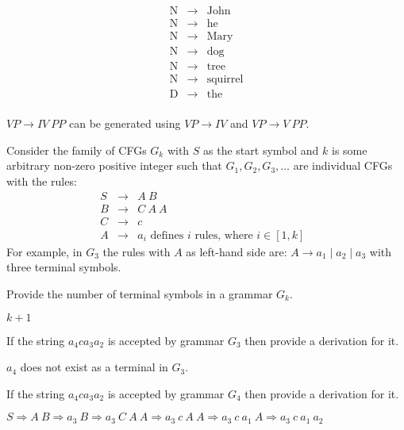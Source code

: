 \documentclass[12pt]{article}
\newcommand{\cfgrule}[2]{#1 & \rightarrow & #2 \nonumber}
\newcommand{\nlcfgrule}[2]{\textrm{#1} & \rightarrow & \textrm{#2} \nonumber}
\begin{document}
\begin{exe}
\begin{minipage}[t]{5cm}
\end{minipage}
\begin{minipage}[t]{5cm}
\begin{eqnarray*}
\nlcfgrule{N}{John}\\
\nlcfgrule{N}{he}\\
\nlcfgrule{N}{Mary}\\
\nlcfgrule{N}{dog}\\
\nlcfgrule{N}{tree}\\
\nlcfgrule{N}{squirrel}\\
\nlcfgrule{D}{the}\\
\end{eqnarray*}
\end{minipage}

\begin{soln}
$VP \rightarrow IV\ PP$ can be generated using $VP \rightarrow IV$ and $VP \rightarrow V\ PP$.
\end{soln}

\bigskip
\ex\label{derivs} Consider the family of CFGs $G_k$ with $S$ as the start symbol and $k$ is some arbitrary non-zero positive integer such that $G_1, G_2, G_3, \ldots$ are individual CFGs with the rules:
\begin{eqnarray*}
\cfgrule{S}{A\ B} \\
\cfgrule{B}{C\ A\ A} \\
\cfgrule{C}{c} \\
\cfgrule{A}{a_i \textrm{\ \ \ defines $i$ rules, where $i \in [1,k]$ }}
\end{eqnarray*}
For example, in $G_3$ the rules with $A$ as left-hand side are: $A \rightarrow a_1 \mid a_2 \mid a_3$ with three terminal symbols.

\begin{xlist}

{\ex Provide the number of terminal symbols in a grammar $G_k$.
\begin{soln}
$k+1$
\end{soln}
}

{\ex If the string $a_4 c a_3 a_2$ is accepted by grammar $G_3$ then provide a derivation for it.
\begin{soln}
$a_4$ does not exist as a terminal in $G_3$.
\end{soln}
}

{\ex If the string $a_4 c a_3 a_2$ is accepted by grammar $G_4$ then provide a derivation for it.
\begin{soln}
$S \Rightarrow A\ B \Rightarrow a_3\ B \Rightarrow a_3\ C\ A\ A \Rightarrow a_3\ c\ A\ A \Rightarrow a_3\ c\ a_1\ A \Rightarrow a_3\ c\ a_1\ a_2$
\end{soln}
}


\end{xlist}
\end{exe}
\end{document}
